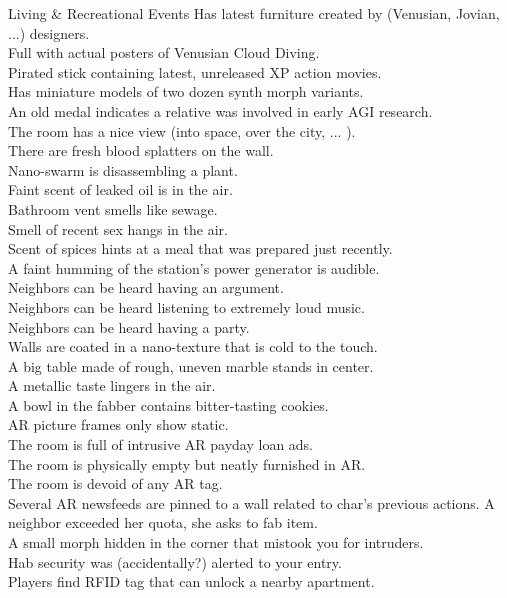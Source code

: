 \begin{tableone}{Living \& Recreational Events}
Has latest furniture created by (Venusian, Jovian, ...) designers.\\
Full with actual posters of Venusian Cloud Diving.\\
Pirated stick containing latest, unreleased XP action movies.\\
Has miniature models of two dozen synth morph variants.\\
An old medal indicates a relative was involved in early AGI research.\\
The room has a nice view (into space, over the city, ... ).\\
There are fresh blood splatters on the wall.\\
Nano-swarm is disassembling a plant.\\
Faint scent of leaked oil is in the air.\\
Bathroom vent smells like sewage.\\
Smell of recent sex hangs in the air.\\
Scent of spices hints at a meal that was prepared just recently.\\
A faint humming of the station's power generator is audible.\\
Neighbors can be heard having an argument.\\
Neighbors can be heard listening to extremely loud music.\\
Neighbors can be heard having a party.\\
Walls are coated in a nano-texture that is cold to the touch.\\
A big table made of rough, uneven marble stands in center.\\
A metallic taste lingers in the air.\\
A bowl in the fabber contains bitter-tasting cookies.\\
AR picture frames only show static.\\
The room is full of intrusive AR payday loan ads.\\
The room is physically empty but neatly furnished in AR.\\
The room is devoid of any AR tag.\\
Several AR newsfeeds are pinned to a wall related to char's previous actions.
A neighbor exceeded her quota, she asks to fab item.\\
A small  morph hidden in the corner that mistook you for intruders.\\
Hab security was (accidentally?) alerted to your entry.\\
Players find RFID tag that can unlock a nearby apartment.\\
\end{tableone}


